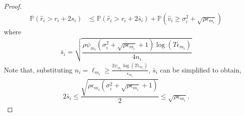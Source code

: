 \begin{proof}
\noindent
\begin{align}
\mathbb{P}(\hat{r}_{i}> r_{i} + 2s_{i})
&\leq \mathbb{P}\left( \hat{r}_{i} > r_{i}+ 2\bar{s}_i\right)  %
+ \mathbb{P}\left( \hat{v}_{i}\geq \sigma_{i}^{2}+\sqrt{\rho\epsilon_{m_{i}}}\right)\label{eq:prob_eq2}
\end{align}
where 
\begin{align*}
\bar{s}_i=\sqrt{\dfrac{\rho\psi_{m_i} (\sigma_{i}^{2}+\sqrt{\rho\epsilon_{m_{i}}} + 1)\log( T\epsilon_{m_{i}})}{4n_{i}}}
\end{align*}
Note that, substituting $n_i=\ell_{m_i}\ge \frac{2\psi_{m_i}\log{(T\epsilon_{m_{i}})}}{\epsilon_{m_{i}}}$, $\bar{s}_i$ can be simplified to obtain,
\begin{align}
2\bar{s}_i
\leq \dfrac{\sqrt{\rho\epsilon_{m_{i}}(\sigma_{i}^{2}+\sqrt{\rho\epsilon_{m_{i}}} + 1)}}{2}\leq \sqrt{\rho \epsilon_{m_{i}}}.
\label{si_bar_equn}
\end{align}



\end{proof}
